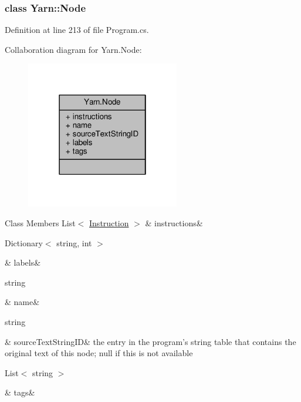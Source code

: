 \subsubsection{class Yarn\-:\-:Node}


Definition at line 213 of file Program.\-cs.



Collaboration diagram for Yarn.\-Node\-:
\nopagebreak
\begin{figure}[H]
\begin{center}
\leavevmode
\includegraphics[width=190pt]{a00367}
\end{center}
\end{figure}
\begin{DoxyFields}{Class Members}
\hypertarget{a00050_a156723a9252b62d288ddf611939ea7c3}{List$<$ \hyperlink{a00115}{Instruction} $>$}\label{a00050_a156723a9252b62d288ddf611939ea7c3}
&
instructions&
\\
\hline

\hypertarget{a00050_a9afa49f4fbc72e806a0210cb4198f12e}{Dictionary$<$ string, int $>$}\label{a00050_a9afa49f4fbc72e806a0210cb4198f12e}
&
labels&
\\
\hline

\hypertarget{a00050_a107b0de3fcfc65e99913edc01b5ce9db}{string}\label{a00050_a107b0de3fcfc65e99913edc01b5ce9db}
&
name&
\\
\hline

\hypertarget{a00050_a09c6af5b50925d0876283b84281b3ed4}{string}\label{a00050_a09c6af5b50925d0876283b84281b3ed4}
&
source\-Text\-String\-I\-D&
the entry in the program's string table that contains the original text of this node; null if this is not available \\
\hline

\hypertarget{a00050_a811086feceebbe79a74eba071c1d516b}{List$<$ string $>$}\label{a00050_a811086feceebbe79a74eba071c1d516b}
&
tags&
\\
\hline

\end{DoxyFields}


